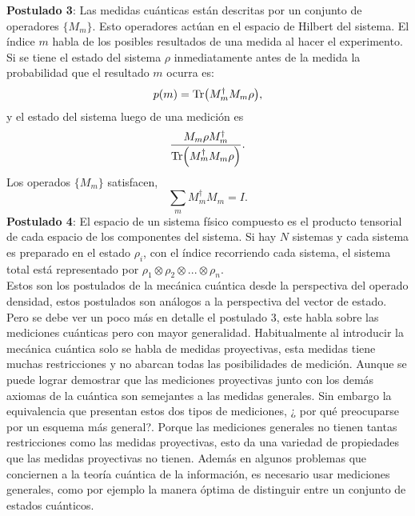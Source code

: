\textbf{Postulado 3}: Las medidas cuánticas están descritas por un conjunto de operadores $ \{  M_{m} \}$. Esto operadores actúan en el espacio de Hilbert del sistema. El índice $m$ habla de los posibles resultados de una medida al hacer el experimento. Si se tiene el estado del sistema $\rho$ inmediatamente antes de la medida la probabilidad que el resultado $m$ ocurra es:
\begin{equation}
p(m)= \Tr (M^{\dagger}_{m}M_{m} \rho),
\end{equation}
y el estado del sistema luego de una medición es
\begin{equation}
\frac{M_{m} \rho M_{m}^{\dagger}}{\Tr(M^{\dagger}_{m}M_{m} \rho)}.
\end{equation}
Los operados $\{  M_{m} \}$ satisfacen,
\begin{equation}
\sum_{m} M^{\dagger}_{m}M_{m} = I.
\end{equation}
\textbf{Postulado 4}: El espacio de un sistema físico compuesto es el producto tensorial de cada espacio de los componentes del sistema. Si  hay $N$ sistemas y cada sistema es preparado en el estado $\rho_{i}$, con el índice recorriendo cada sistema, el sistema total está representado por $\rho_{1} \otimes \rho_{2} \otimes ...\otimes \rho_{n}$.
\\
Estos son los postulados de la mecánica cuántica desde la perspectiva del operado densidad, estos postulados son análogos a la perspectiva del vector de estado. Pero se debe ver un poco más en detalle el postulado 3, este habla sobre las mediciones cuánticas pero con mayor generalidad. Habitualmente al introducir la mecánica cuántica solo se habla de medidas proyectivas, esta medidas tiene muchas restricciones y no abarcan todas las posibilidades de medición.  Aunque se puede lograr demostrar que las mediciones proyectivas junto con los demás axiomas de la cuántica son semejantes a las medidas generales. Sin embargo la equivalencia que presentan estos dos tipos de mediciones, ¿  por qué preocuparse por un esquema más general?. Porque las mediciones generales no tienen tantas restricciones como las medidas proyectivas, esto da una variedad de propiedades que las medidas proyectivas no tienen. Además en algunos problemas que conciernen a la teoría cuántica de la información, es necesario usar mediciones generales, como por ejemplo la manera óptima de distinguir entre un conjunto de estados cuánticos.
\\
